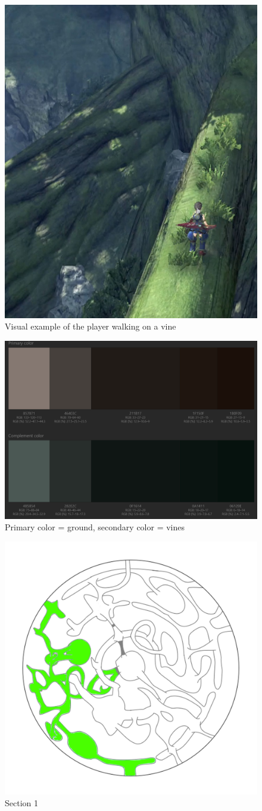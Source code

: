 \begin{figure}[H]
	\centering
	\includegraphics[width=0.5\linewidth]{images/visual_ref/15_giant_chasm/tree.jpg}
	\caption*{Visual example of the player walking on a vine}
\end{figure}

\begin{figure}[H]
	\centering
	\includegraphics[width=0.8\linewidth]{images/visual_ref/15_giant_chasm/pallette/pallette_section_01.png}
	\caption*{Primary color = ground, secondary color = vines}
\end{figure}

\begin{figure}[H]
	\centering
	\includegraphics[width=0.7\linewidth]{images/map/2D_map_section_01.png}
	\caption*{Section 1}
\end{figure}

